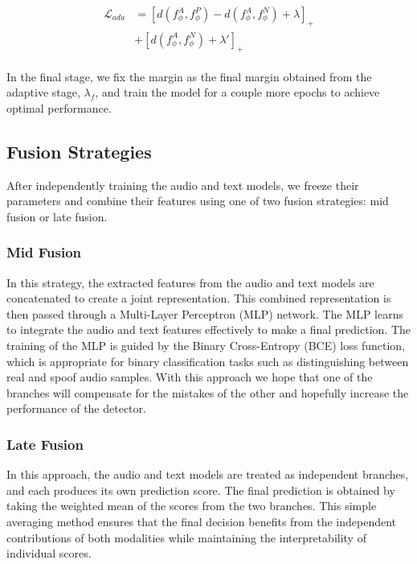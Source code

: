 \documentclass{Interspeech}
\begin{document}
\begin{align}
  \begin{split}
    \mathcal{L}_{ada} & = [d(f_\phi^{A},f_\phi^{P}) - d(f_\phi^{A},f_\phi^{N})+ \lambda]_{+} \\
                      & + [d(f_\phi^{A},f_\phi^{N}) + \lambda']_{+}
  \end{split}
\end{align}

In the final stage, we fix the margin as the final margin obtained from the
adaptive stage, $\lambda_{f}$, and train the model for a couple more epochs to
achieve optimal performance.

\subsection{Fusion Strategies}
After independently training the audio and text models, we freeze their
parameters and combine their features using one of two fusion strategies: mid
fusion or late fusion.

\subsubsection{Mid Fusion}
In this strategy, the extracted features from the audio and text models are
concatenated to create a joint representation. This combined representation is
then passed through a Multi-Layer Perceptron (MLP) network. The MLP learns to
integrate the audio and text features effectively to make a final prediction.
The training of the MLP is guided by the Binary Cross-Entropy (BCE) loss
function, which is appropriate for binary classification tasks such as
distinguishing between real and spoof audio samples. With this approach we hope
that one of the branches will compensate for the mistakes of the other and
hopefully increase the performance of the detector.

\subsubsection{Late Fusion}
In this approach, the audio and text models are treated as independent
branches, and each produces its own prediction score. The final prediction is
obtained by taking the weighted mean of the scores from the two branches. This
simple averaging method ensures that the final decision benefits from the
independent contributions of both modalities while maintaining the
interpretability of individual scores.
\end{document}
